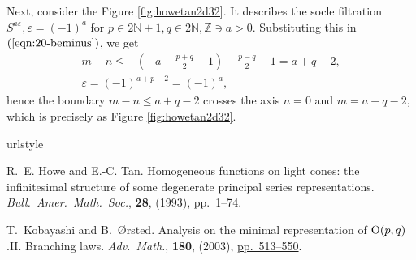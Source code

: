 \documentclass[12pt]{article} %
\theoremstyle{remark}
\begin{document}
Next, consider the Figure \ref{fig:howetan2d32}. It describes the socle
filtration $S^{a \varepsilon}, \varepsilon = (- 1)^a$ for $p \in 2\mathbb{N}+
1, q \in 2\mathbb{N}, \mathbb{Z} \ni a > 0$. Substituting this in
$(\ref{eqn:20-beminus})$, we get
\begin{eqnarray}
  & m - n \leqslant - \left( - a - \frac{p + q}{2} + 1 \right) - \frac{p -
  q}{2} - 1 = a + q - 2, &  \nonumber\\
  & \varepsilon = (- 1)^{a + p - 2} = (- 1)^a,^{} &  \nonumber
\end{eqnarray}
hence the boundary $m - n \leqslant a + q - 2$ crosses the axis $n = 0$ and $m
= a + q - 2$, which is precisely as Figure \ref{fig:howetan2d32}.

\begin{thebibliography}{9}
\expandafter\ifx\csname urlstyle\endcsname\relax
  \providecommand{\doi}[1]{doi:\discretionary{}{}{}#1}\else
  \providecommand{\doi}{doi:\discretionary{}{}{}\begingroup
  \urlstyle{rm}\Url}\fi

R.~E. Howe and E.-C. Tan.
\newblock Homogeneous functions on light cones: the infinitesimal structure of
  some degenerate principal series representations.
\newblock \emph{{\normalfont Bull.~Amer.~Math.~Soc.}}, \textbf{28},
  (1993), pp.~1--74.

T.~Kobayashi and B.~{\O}rsted.
\newblock Analysis on the minimal representation of\/ {${\rm O}(p,q)$}.{\;}{{\rm{II}}}. {B}ranching laws.
\newblock \emph{\normalfont Adv.~Math.}, \textbf{180}, (2003),
\href{http://dx.doi.org/10.1016/S0001-8708(03)00013-6}{pp.~513--550}.

\end{thebibliography}
\end{document}
